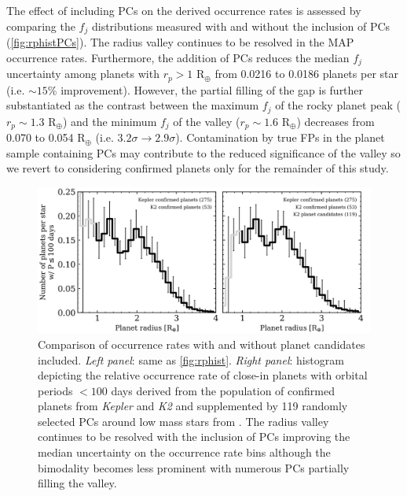 \documentclass[twocolumn]{emulateapj}
\newcommand{\kepler}[1]{\emph{Kepler}#1}
\newcommand{\ktwo}[1]{\emph{K2}#1}
\begin{document}


The effect of including PCs on the derived occurrence rates is assessed by comparing the $f_j$ distributions
measured with and without the inclusion of PCs (\autoref{fig:rphistPCs}). The radius valley continues to be resolved in
the MAP occurrence rates. Furthermore, the addition of PCs reduces the median $f_j$ uncertainty among planets
with $r_p>1$ R$_{\oplus}$ from
0.0216 to 0.0186 planets per star (i.e. $\sim 15$\% improvement). However, the partial filling of the gap is
further substantiated as the contrast between the maximum $f_j$ of the rocky planet peak ($r_p \sim 1.3$ R$_{\oplus}$)
and the minimum $f_j$ of the valley ($r_p \sim 1.6$ R$_{\oplus}$) decreases from 0.070
to 0.054 R$_{\oplus}$ (i.e. $3.2\sigma \to 2.9\sigma$). Contamination by true FPs in the planet sample containing
PCs may contribute to the reduced significance of the valley so we revert to considering confirmed planets only
for the remainder of this study. 


\begin{figure}
  \centering
  \includegraphics[scale=.8]{figures/rphist_kruse.png}
  \caption{Comparison of occurrence rates with and without planet candidates included. \emph{Left panel}:
    same as \autoref{fig:rphist}. \emph{Right panel}: histogram depicting the relative occurrence
    rate of close-in planets with orbital periods $<100$ days derived from the population of confirmed
    planets from \kepler{} and \ktwo{} and supplemented by 119 randomly selected PCs
    around low mass stars from \cite{kruse19}. The radius valley continues to be resolved with
    the inclusion of PCs improving the median uncertainty on the occurrence rate bins although the
    bimodality becomes less prominent with numerous PCs partially filling the valley.}
  \label{fig:rphistPCs}
\end{figure}
\end{document}
